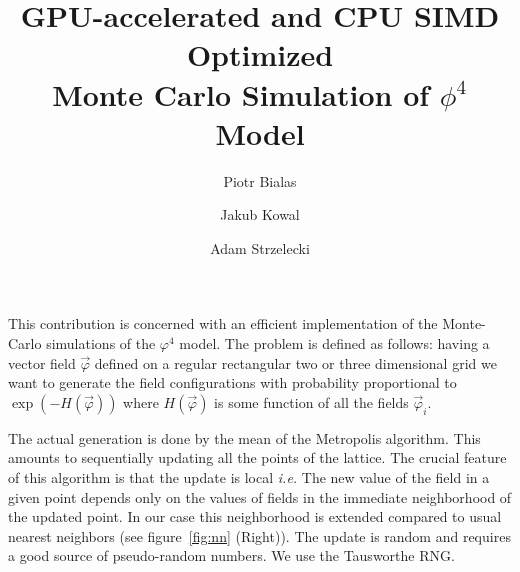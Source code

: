 \documentclass[a4paper]{llncs}
\title{ GPU-accelerated and CPU SIMD Optimized \\ Monte Carlo Simulation of $\phi^4$ Model}
\author{Piotr Bialas \and Jakub Kowal \and Adam Strzelecki}
\institute{Faculty of Physics, Astronomy and Applied Computer Science\\
Jagiellonian University\\
ul. Reymonta 4, 30-059 Krakow, Poland }
\newcommand{\vphi}{\vec{\varphi}}
\begin{document}
\maketitle


This contribution is concerned with an efficient implementation of the
Monte-Carlo simulations of the $\varphi^4$ model\cite{parisi}. The
problem is defined as follows: having a vector field $\vphi$ defined
on a regular rectangular two or three dimensional grid we want to
generate the field configurations with probability proportional to
$\exp(-H(\vphi))$ where $H(\vphi)$ is some function of all the fields
$\vphi_i$.

The actual generation is done by the mean of the Metropolis
algorithm. This amounts to sequentially updating all the points of
the lattice. The crucial feature of this algorithm is that the update
is local {\em i.e.} The new value of the field in a given point
depends only on the values of fields in the immediate neighborhood of
the updated point. In our case this neighborhood is extended
compared to usual nearest neighbors (see figure~\ref{fig:nn}
(Right)). The update is random and requires a good source of
pseudo-random numbers. We use the  Tausworthe RNG\cite{howes_thomas07}.
\end{document}
